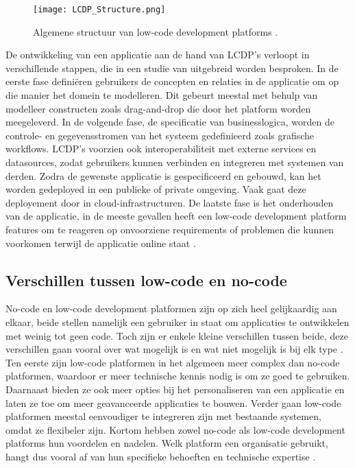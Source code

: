 \begin{figure}[ht]
    \centering
    \texttt{[image: LCDP\_Structure.png]}
    \caption{Algemene structuur van low-code development platforms \autocite{Sahay2020}.}
    \label{fig:lcdp_structure}
\end{figure}

De ontwikkeling van een applicatie aan de hand van LCDP's verloopt in verschillende stappen, die in een studie van \textcite{Ruscio2022} uitgebreid worden besproken. In de eerste fase definiëren gebruikers de concepten en relaties in de applicatie om op die manier het domein te modelleren. Dit gebeurt meestal met behulp van modelleer constructen zoals drag-and-drop die door het platform worden meegeleverd. In de volgende fase, de specificatie van businesslogica, worden de controle- en gegevensstromen van het systeem gedefinieerd zoals grafische workflows. LCDP's voorzien ook interoperabiliteit met externe services en datasources, zodat gebruikers kunnen verbinden en integreren met systemen van derden. Zodra de gewenste applicatie is gespecificeerd en gebouwd, kan het worden gedeployed in een publieke of private omgeving. Vaak gaat deze deployement door in cloud-infrastructuren. De laatste fase is het onderhouden van de applicatie, in de meeste gevallen heeft een low-code development platform features om te reageren op onvoorziene requirements of problemen die kunnen voorkomen terwijl de applicatie online staat . \\

\subsection{Verschillen tussen low-code en no-code}
\label{subsec:verschillen_low_code}

No-code en low-code development platformen zijn op zich heel gelijkaardig aan elkaar, beide stellen namelijk een gebruiker in staat om applicaties te ontwikkelen met weinig tot geen code. Toch zijn er enkele kleine verschillen tussen beide, deze verschillen gaan vooral over wat mogelijk is en wat niet mogelijk is bij elk type \autocite{Yan2021}. Ten eerste zijn low-code platformen in het algemeen meer complex dan no-code platformen, waardoor er meer technische kennis nodig is om ze goed te gebruiken. Daarnaast bieden ze ook meer opties bij het personaliseren van een applicatie en laten ze toe om meer geavanceerde applicaties te bouwen. Verder gaan low-code platformen meestal eenvoudiger te integreren zijn met bestaande systemen, omdat ze flexibeler zijn. Kortom hebben zowel no-code als low-code development platforms hun voordelen en nadelen. Welk platform een organisatie gebruikt, hangt dus vooral af van hun specifieke behoeften en technische expertise \autocite{Yan2021}.

